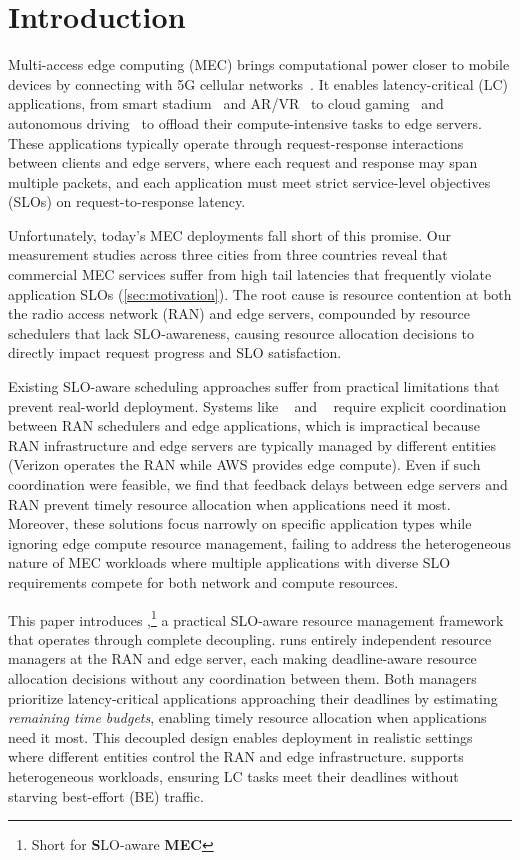 \section{Introduction}
\label{sec:intro}

Multi-access edge computing (MEC) brings computational power closer to mobile devices by connecting with 5G cellular networks~\cite{wavelength, tmobile}.
It enables latency-critical (LC) applications, from smart stadium~\cite{www-orange-5gstadium,www-red5perfect5G-in-venue} and AR/VR~\cite{www-cloudxr,liu2019edge} to cloud gaming~\cite{www-xbox-cloud,www-ericsson-cloud-gaming} and autonomous driving~\cite{www-dt-driving} to offload their compute-intensive tasks to edge servers. 
These applications typically operate through request-response interactions between clients and edge servers, where each request and response may span multiple packets, and each application must meet strict service-level objectives (SLOs) on request-to-response latency.

Unfortunately, today's MEC deployments fall short of this promise.
Our measurement studies across three cities from three countries reveal that commercial MEC services suffer from high tail latencies that frequently violate application SLOs (\autoref{sec:motivation}).
The root cause is resource contention at both the radio access network (RAN) and edge servers, compounded by resource schedulers that lack SLO-awareness, causing resource allocation decisions to directly impact request progress and SLO satisfaction.

Existing SLO-aware scheduling approaches suffer from practical limitations that prevent real-world deployment.
Systems like \tutti{}~\cite{xu2022tutti} and \arma{}~\cite{arma:mobisys25} require explicit coordination between RAN schedulers and edge applications, which is impractical because RAN infrastructure and edge servers are typically managed by different entities (\eg Verizon operates the RAN while AWS provides edge compute).
Even if such coordination were feasible, we find that feedback delays between edge servers and RAN prevent timely resource allocation when applications need it most. 
Moreover, these solutions focus narrowly on specific application types while ignoring edge compute resource management, failing to address the heterogeneous nature of MEC workloads where multiple applications with diverse SLO requirements compete for both network and compute resources.

This paper introduces \sys{},\footnote{Short for \textbf{S}LO-aware \textbf{MEC}} a practical SLO-aware resource management framework that operates through complete decoupling. 
\sys{} runs entirely independent resource managers at the RAN and edge server, each making deadline-aware resource allocation decisions without any coordination between them. 
Both managers prioritize latency-critical applications approaching their deadlines by estimating \emph{remaining time budgets}, enabling timely resource allocation when applications need it most.
This decoupled design enables deployment in realistic settings where different entities control the RAN and edge infrastructure.
\sys{} supports heterogeneous workloads, ensuring LC tasks meet their deadlines without starving best-effort (BE) traffic.

